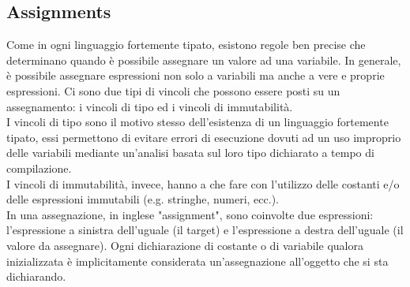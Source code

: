 \subsection{Assignments}
Come in ogni linguaggio fortemente tipato, esistono regole ben precise che determinano
quando è possibile assegnare un valore ad una variabile. In generale, è possibile assegnare 
espressioni non solo a variabili ma anche a vere e proprie espressioni. Ci sono due tipi di vincoli
che possono essere posti su un assegnamento: i vincoli di tipo ed i vincoli di immutabilità. \\

I vincoli di tipo sono il motivo stesso dell'esistenza di un linguaggio fortemente tipato,
essi permettono di evitare errori di esecuzione dovuti ad un uso improprio delle variabili
mediante un'analisi basata sul loro tipo dichiarato a tempo di compilazione. \\

I vincoli di immutabilità, invece, hanno a che fare con l'utilizzo delle costanti e/o
delle espressioni immutabili (e.g. stringhe, numeri, ecc.). \\

In una assegnazione, in inglese "assignment", sono coinvolte due espressioni: l'espressione a sinistra
dell'uguale (il target) e l'espressione a destra dell'uguale (il valore da assegnare). Ogni dichiarazione
di costante o di variabile qualora inizializzata è implicitamente considerata un'assegnazione
all'oggetto che si sta dichiarando.








